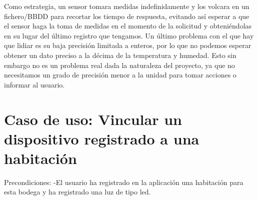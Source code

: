 Como estrategia, un sensor tomara medidas indefinidamente y los volcara en un fichero/BBDD para recortar los tiempo de respuesta, evitando así esperar a que el sensor haga la toma de medidas en el momento de la solicitud y obteniéndolas en su lugar del último registro que tengamos. Un último problema con el que hay que lidiar es su baja precisión limitada a enteros, por lo que no podemos esperar obtener un dato preciso a la décima de la temperatura y humedad. Esto sin embargo no es un problema real dada la naturaleza del proyecto, ya que no necesitamos un grado de precisión menor a la unidad para tomar acciones o informar al usuario.

\section{Caso de uso: Vincular un dispositivo registrado a una habitación}
\label{ch:Capitulo5.2}
Precondiciones:
    -El usuario ha registrado en la aplicación una habitación para esta bodega y ha registrado una luz de tipo led.
